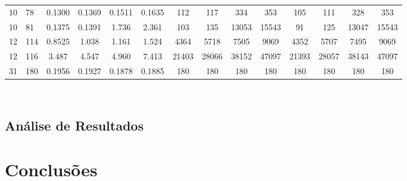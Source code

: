 \documentclass[12pt,a4paper]{article}
\begin{document}
\begin{adjustbox}{width={\textwidth}, totalheight={\textheight}, keepaspectratio}
\begin{tabular}{ll cccc cccc cccc}
    10                        & 78                                        & 0.1300                          & 0.1369                             & 0.1511 & 0.1635 & 112   & 117   & 334   & 353   & 105   & 111   & 328   & 353   \\
    10                        & 81                                        & 0.1375                          & 0.1391                             & 1.736  & 2.361  & 103   & 135   & 13053 & 15543 & 91    & 125   & 13047 & 15543 \\
    12                        & 114                                       & 0.8525                          & 1.038                              & 1.161  & 1.524  & 4364  & 5718  & 7505  & 9069  & 4352  & 5707  & 7495  & 9069  \\
    12                        & 116                                       & 3.487                           & 4.547                              & 4.960  & 7.413  & 21403 & 28066 & 38152 & 47097 & 21393 & 28057 & 38143 & 47097 \\
    31                        & 180                                       & 0.1956                          & 0.1927                             & 0.1878 & 0.1885 & 180   & 180   & 180   & 180   & 180   & 180   & 180   & 180   \\
    \bottomrule
  \end{tabular}
\end{adjustbox} \\


\subsection{Análise de Resultados}


\section{Conclusões}
\end{document}
